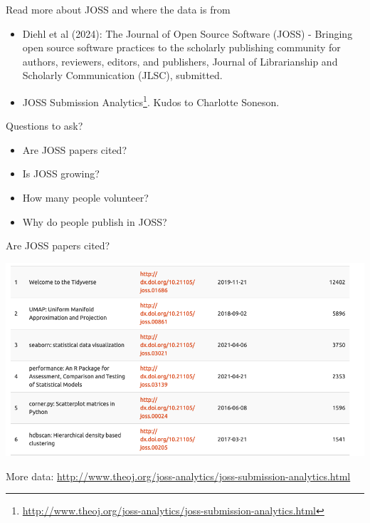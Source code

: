\begin{frame}{Read more about JOSS and where the data is from}

\begin{itemize}
\item Diehl et al (2024): The Journal of Open Source Software (JOSS) - Bringing open source software practices to the scholarly publishing community for authors, reviewers, editors, and publishers, Journal of Librarianship and Scholarly Communication (JLSC), submitted.
\item JOSS Submission Analytics\footnote{\tiny\url{http://www.theoj.org/joss-analytics/joss-submission-analytics.html}}. Kudos to Charlotte Soneson.
\end{itemize}
\begin{block}{Questions to ask?}
\begin{itemize}
\item Are JOSS papers cited?
\item Is JOSS growing?
\item How many people volunteer?
\item Why do people publish in JOSS?
\end{itemize}
\end{block}

\end{frame}


\begin{frame}{Are JOSS papers cited?}

\includegraphics[width=\linewidth]{most-cited.png}

{\tiny More data: \url{http://www.theoj.org/joss-analytics/joss-submission-analytics.html}}    
\end{frame}

